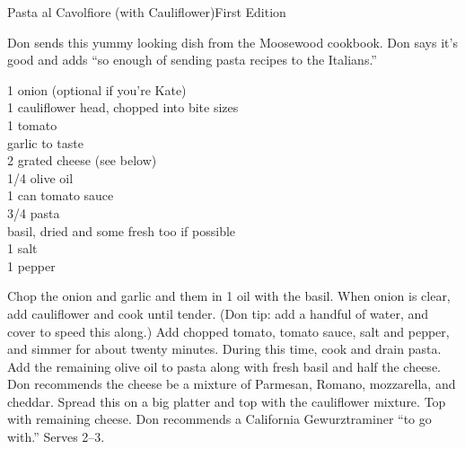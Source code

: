 \begin{entry}{Pasta al Cavolfiore (with Cauliflower)}{First Edition}

\begin{open}
  Don sends this yummy looking dish from the Moosewood cookbook. Don
  says it's good and adds ``so enough of sending pasta recipes to the
  Italians.''
\end{open}
\begin{ingredients}
  1 onion (optional if you're Kate)\\
  1 cauliflower head, chopped into bite sizes\\
  1 tomato\\
  garlic to taste\\
  \SI{2}{\cup} grated cheese (see below)\\
  \SI{1/4}{\cup} olive oil\\
  1 can tomato sauce\\
  \SI{3/4}{\pound} pasta\\
  basil, dried and some fresh too if possible\\
  \SI{1}{\teaspoon} salt\\
  \SI{1}{\teaspoon} pepper
\end{ingredients}
Chop the onion and garlic and \saute them in \SI{1}{\teaspoon} oil with the
basil. When onion is clear, add cauliflower and cook until tender. (Don tip: add
a handful of water, and cover to speed this along.) Add chopped tomato, tomato
sauce, salt and pepper, and simmer for about twenty minutes. During this time,
cook and drain pasta. Add the remaining olive oil to pasta along with fresh
basil and half the cheese. Don recommends the cheese be a mixture of Parmesan,
Romano, mozzarella, and cheddar. Spread this on a big platter and top with the
cauliflower mixture. Top with remaining cheese. Don recommends a California
Gewurztraminer ``to go with.''  Serves \numrange{2}{3}.
\end{entry}

